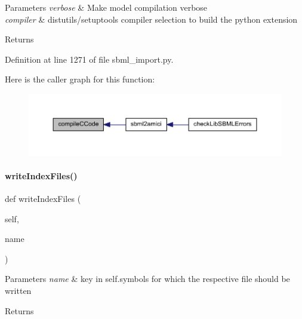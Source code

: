 \begin{DoxyParams}{Parameters}
{\em verbose} & Make model compilation verbose \\
\hline
{\em compiler} & distutils/setuptools compiler selection to build the python extension \\
\hline
\end{DoxyParams}
\begin{DoxyReturn}{Returns}

\end{DoxyReturn}


Definition at line 1271 of file sbml\+\_\+import.\+py.

Here is the caller graph for this function\+:
\nopagebreak
\begin{figure}[H]
\begin{center}
\leavevmode
\includegraphics[width=350pt]{classamici_1_1sbml__import_1_1_sbml_importer_ae3542bf042c5054d80091f219ef917f7_icgraph}
\end{center}
\end{figure}
\mbox{\label{classamici_1_1sbml__import_1_1_sbml_importer_a3d3ce5678111ebd3987ec0539f07438e}} 
\paragraph{\texorpdfstring{write\+Index\+Files()}{writeIndexFiles()}}
{\footnotesize\ttfamily def write\+Index\+Files (\begin{DoxyParamCaption}\item[{}]{self,  }\item[{}]{name }\end{DoxyParamCaption})}


\begin{DoxyParams}{Parameters}
{\em name} & key in self.\+symbols for which the respective file should be written\\
\hline
\end{DoxyParams}
\begin{DoxyReturn}{Returns}

\end{DoxyReturn}


